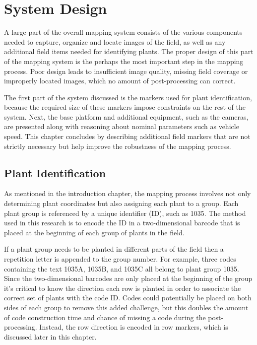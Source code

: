 
\cleardoublepage

\chapter{System Design}
\label{chapter:system_design}

A large part of the overall mapping system consists of the various components needed to capture, organize and locate images of the field, as well as any additional field items needed for identifying plants.  The proper design of this part of the mapping system is the perhaps the most important step in the mapping process.  Poor design leads to insufficient image quality, missing field coverage or improperly located images, which no amount of post-processing can correct.  

The first part of the system discussed is the markers used for plant identification, because the required size of these markers impose constraints on the rest of the system.  Next, the base platform and additional equipment, such as the cameras, are presented along with reasoning about nominal parameters such as vehicle speed.  This chapter concludes by describing additional field markers that are not strictly necessary but help improve the robustness of the mapping process. 

\section{Plant Identification}
\label{section:plantid}

As mentioned in the introduction chapter, the mapping process involves not only determining plant coordinates but also assigning each plant to a group.  Each plant group is referenced by a unique identifier (ID), such as 1035.  The method used in this research is to encode the ID in a two-dimensional barcode that is placed at the beginning of each group of plants in the field. 

If a plant group needs to be planted in different parts of the field then a repetition letter is appended to the group number.  For example, three codes containing the text 1035A, 1035B, and 1035C all belong to plant group 1035.  Since the two-dimensional barcodes are only placed at the beginning of the group it's critical to know the direction each row is planted in order to associate the correct set of plants with the code ID.  Codes could potentially be placed on both sides of each group to remove this added challenge, but this doubles the amount of code construction time and chance of missing a code during the post-processing.  Instead, the row direction is encoded in row markers, which is discussed later in this chapter.

